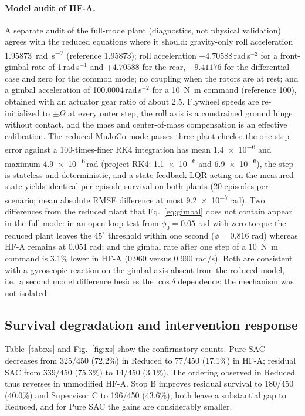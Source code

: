 \documentclass[preprint,12pt,authoryear=false]{elsarticle}
\theoremstyle{remark}\newtheorem{remark}{Remark}
\theoremstyle{plain}\newtheorem{proposition}{Proposition}\newtheorem{lemma}{Lemma}
\theoremstyle{definition}\newtheorem{assumption}{Assumption}
\begin{document}
\paragraph{Model audit of HF-A.} A separate audit of the full-mode plant (diagnostics, not physical validation) agrees with the reduced equations where it should: gravity-only roll acceleration \SI{1.95873}{rad.s^{-2}} (reference 1.95873); roll acceleration $-4.70588$\,rad\,s$^{-2}$ for a front-gimbal rate of 1\,rad\,s$^{-1}$ and $+4.70588$ for the rear, $-9.41176$ for the differential case and zero for the common mode; no coupling when the rotors are at rest; and a gimbal acceleration of 100.0004\,rad\,s$^{-2}$ for a \SI{10}{N.m} command (reference 100), obtained with an actuator gear ratio of about 2.5. Flywheel speeds are re-initialized to $\pm\Omega$ at every outer step, the roll axis is a constrained ground hinge without contact, and the mass and center-of-mass compensation is an effective calibration. The reduced MuJoCo mode passes three plant checks: the one-step error against a 100-times-finer RK4 integration has mean \num{1.4e-6} and maximum \num{4.9e-6}\,rad (project RK4: \num{1.1e-6} and \num{6.9e-6}), the step is stateless and deterministic, and a state-feedback LQR acting on the measured state yields identical per-episode survival on both plants (20 episodes per scenario; mean absolute RMSE difference at most \num{9.2e-7}\,rad). Two differences from the reduced plant that Eq.~\eqref{eq:gimbal} does not contain appear in the full mode: in an open-loop test from $\phi_0=0.05$ rad with zero torque the reduced plant leaves the $45^\circ$ threshold within one second ($\phi=0.816$ rad) whereas HF-A remains at 0.051 rad; and the gimbal rate after one step of a \SI{10}{N.m} command is 3.1\% lower in HF-A (0.960 versus 0.990 rad/s). Both are consistent with a gyroscopic reaction on the gimbal axis absent from the reduced model, i.e.\ a second model difference besides the $\cos\delta$ dependence; the mechanism was not isolated.

\subsection{Survival degradation and intervention response}
Table~\ref{tab:xs} and Fig.~\ref{fig:xs} show the confirmatory counts. Pure SAC decreases from 325/450 (72.2\%) in Reduced to 77/450 (17.1\%) in HF-A; residual SAC from 339/450 (75.3\%) to 14/450 (3.1\%). The ordering observed in Reduced thus reverses in unmodified HF-A. Stop B improves residual survival to 180/450 (40.0\%) and Supervisor C to 196/450 (43.6\%); both leave a substantial gap to Reduced, and for Pure SAC the gains are considerably smaller.
\end{document}

